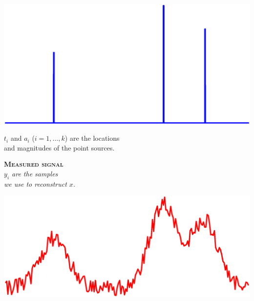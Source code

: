 \documentclass[a0paper,portrait,fontscale=0.35]{baposter}
\newcommand{\mycaption}[1]{
  {
    \smaller
    \emph{#1}
  }
}
\theoremstyle{plain}
\theoremstyle{plain}
\theoremstyle{definition}
\theoremstyle{plain}
\theoremstyle{definition}
\begin{document}
\begin{poster}
{\begin{minipage}[t]{\textwidth}
\begin{minipage}[t]{0.49\textwidth}
      \begin{minipage}[t]{\textwidth}
        \centering
        \includegraphics[height=0.045\textheight]{img/sig.eps}
        
      \end{minipage}
     
      \vspace{-0.5em}
      \begin{center}
      \end{center}

      \hspace{1em}
      { \smaller 
        $t_i$ and $a_i$ ($i=1,\ldots,k$) are the locations\\
        and magnitudes of the point sources.}
    
    \end{minipage}
    \begin{minipage}[t]{0.49\textwidth}
      \begin{center}
        \larger
        {\color{red}\textbf{\textsc{Measured signal}}}\\
        \textit{$y_i$ are the samples\\
          we use to reconstruct $x$.}
      \end{center}
      
      \begin{minipage}[t]{\textwidth}
        \centering
        \includegraphics[height=0.046\textheight]{img/measured_sig.eps}


\end{minipage}
\end{minipage}
\end{minipage}}
\end{poster}
\end{document}
